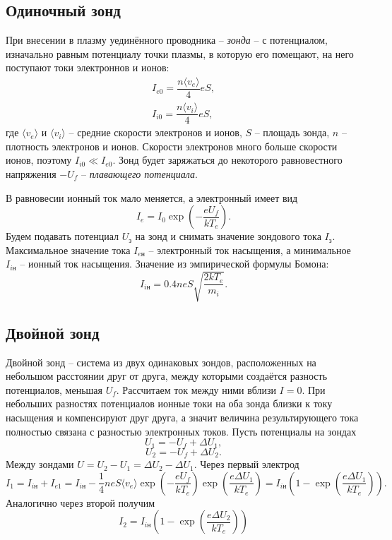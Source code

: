 \documentclass[a4paper,12pt]{article}
\begin{document}
\subsection*{Одиночный зонд}
При внесении в плазму уединённого проводника -- \textit{зонда} -- с потенциалом, изначально равным потенциалу точки плазмы, в которую его помещают, на него поступают токи электроннов и ионов:
\begin{equation}
\begin{array}{c}
I_{e0} = \dfrac{n \langle v_e \rangle}{4}eS,\\
I_{i0} = \dfrac{n \langle v_i \rangle}{4}eS,
\end{array}
\end{equation}
где $\langle v_e \rangle$ и $\langle v_i \rangle$ -- средние скорости электронов и ионов, $S$ -- площадь зонда, $n$ -- плотность электронов и ионов. Скорости электронов много больше скорости ионов, поэтому $I_{i0} \ll I_{e0}$. Зонд будет заряжаться до некоторого равновестного напряжения $-U_f$ -- \textit{плавающего потенциала}.\\
\begin{figure}
\end{figure}
В равновесии ионный ток мало меняется, а электронный имеет вид
$$
I_e = I_0 \exp\left( -\dfrac{eU_f}{kT_e} \right).
$$
Будем подавать потенциал $U_\text{з}$ на зонд и снимать значение зондового тока $I_\text{з}$. Максимальное значение тока $I_{e\text{н}}$ -- электронный ток насыщения, а минимальное $I_{i\text{н}}$ -- ионный ток насыщения. Значение из эмпирической формулы Бомона:
\begin{equation}
I_{i\text{н}} = 0.4 neS \sqrt{\dfrac{2kT_e}{m_i}}.
\end{equation}
\subsection*{Двойной зонд}
Двойной зонд -- система из двух одинаковых зондов, расположенных на небольшом расстоянии друг от друга, между которыми создаётся разность потенциалов, меньшая $U_f$. Рассчитаем ток между ними вблизи $I=0$. При небольших разностях потенциалов ионные токи на оба зонда близки к току насыщения и компенсируют друг друга, а значит величина результирующего тока полностью связана с разностью электронных токов. Пусть потенциалы на зондах
$$
U_1 = -U_f + \Delta U_1,
$$
$$
U_2 = -U_f + \Delta U_2.
$$
Между зондами $U = U_2 - U_1 = \Delta U_2 - \Delta U_1$.
Через первый электрод
\begin{equation}
I_1 = I_{i\text{н}} + I_{e1} = I_{i\text{н}} - \dfrac{1}{4}neS\langle v_e\rangle \exp\left(-\dfrac{eU_f}{kT_e}\right)\exp\left(\dfrac{e\Delta U_1}{kT_e}\right)=I_{i\text{н}}\left(1 - \exp\left( \dfrac{e\Delta U_1}{kT_e} \right)\right).
\end{equation}
Аналогично через второй получим
\begin{equation}
I_2 = I_{i\text{н}}\left(1 - \exp\left( \dfrac{e\Delta U_2}{kT_e} \right)\right)
\end{equation}
\end{document}
